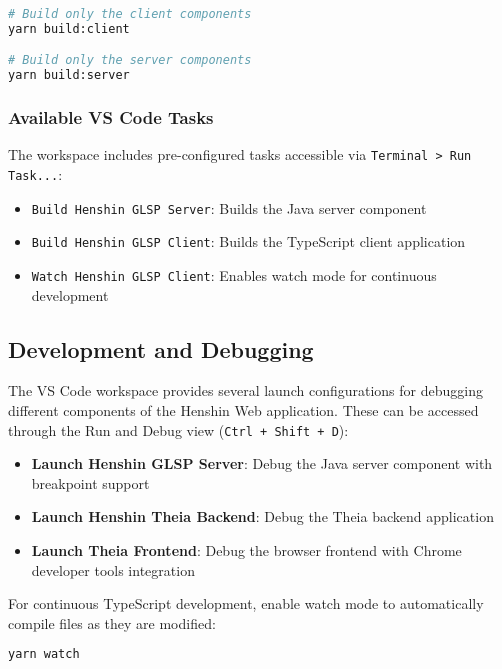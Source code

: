 \begin{lstlisting}[language=bash]
# Build only the client components
yarn build:client

# Build only the server components  
yarn build:server
\end{lstlisting}

\subsubsection{Available VS Code Tasks}

The workspace includes pre-configured tasks accessible via \texttt{Terminal > Run Task...}:

\begin{itemize}
    \item \texttt{Build Henshin GLSP Server}: Builds the Java server component
    \item \texttt{Build Henshin GLSP Client}: Builds the TypeScript client application
    \item \texttt{Watch Henshin GLSP Client}: Enables watch mode for continuous development
\end{itemize}

\subsection{Development and Debugging}
\label{subsec:debugging}

The VS Code workspace provides several launch configurations for debugging different components of the Henshin Web application. These can be accessed through the Run and Debug view (\texttt{Ctrl + Shift + D}):

\begin{itemize}
    \item \textbf{Launch Henshin GLSP Server}: Debug the Java server component with breakpoint support
    \item \textbf{Launch Henshin Theia Backend}: Debug the Theia backend application
    \item \textbf{Launch Theia Frontend}: Debug the browser frontend with Chrome developer tools integration
\end{itemize}

For continuous TypeScript development, enable watch mode to automatically compile files as they are modified:

\begin{lstlisting}[language=bash]
yarn watch
\end{lstlisting}

